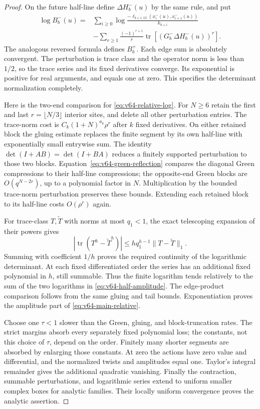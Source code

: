 \begin{proof}
On the future half-line define $\Delta H_b^-(u)$ by the same rule,
and put
\begin{equation}\label{eq:v64-half-amplitude}
 \begin{split}
 \log B_b^-(u)
  ={}&\sum_{i\ge0}\log
       \frac{-\ell_{b+i,12}(x_i^-(u),x_{i+1}^-(u))}{k_{b+i}}\\
    &-\sum_{r\ge1}\frac{(-1)^{r+1}}r
                   \operatorname{tr}[(G_b^-\Delta H_b^-(u))^r].
 \end{split}
\end{equation}
The analogous reversed formula defines $B_b^+$.  Each edge sum is
absolutely convergent.  The perturbation is trace class and the operator
norm is less than $1/2$, so the trace series and its fixed derivatives
converge.  Its exponential is positive for real arguments, and equals
one at zero.  This specifies the determinant normalization completely.

Here is the two-end comparison for \eqref{eq:v64-relative-log}.
For $N\ge6$ retain the first and last $r=\lfloor N/3\rfloor$
interior sites, and delete all other perturbation entries.  The
trace-norm cost is $C_k(1+N)^{a_k}\rho^r$ after $k$ fixed
derivatives.  On either retained block the gluing estimate replaces
the finite segment by its own half-line with exponentially small
entrywise sum.  The identity $\det(I+AB)=\det(I+BA)$ reduces a
finitely supported perturbation to those two blocks.
Equation~\eqref{eq:v64-green-reflection} compares the diagonal Green
compressions to their half-line compressions; the opposite-end Green
blocks are $O(q^{N-2r})$, up to a polynomial factor in $N$.
Multiplication by the bounded trace-norm perturbation preserves these
bounds.  Extending each retained block to its half-line costs
$O(\rho^r)$ again.

For trace-class $T,\widetilde T$ with norms at most $q_1<1$, the
exact telescoping expansion of their powers gives
\[
 |\operatorname{tr}(T^h-\widetilde T^h)|
       \le hq_1^{h-1}\|T-\widetilde T\|_1.
\]
Summing with coefficient $1/h$ proves the required continuity of the
logarithmic determinant.  At each fixed differentiated order the series
has an additional fixed polynomial in $h$, still summable.  Thus the
finite logarithm tends relatively to the sum of the two logarithms in
\eqref{eq:v64-half-amplitude}.  The edge-product comparison follows
from the same gluing and tail bounds.  Exponentiation proves the
amplitude part of \eqref{eq:v64-main-relative}.

Choose one $\tau<1$ slower than the Green, gluing, and block-truncation
rates.  The strict margins absorb every separately fixed polynomial
loss; the constants, not this choice of $\tau$, depend on the order.
Finitely many shorter segments are absorbed by enlarging those constants.
At zero the actions have zero value and differential, and the normalized
twists and amplitudes equal one.  Taylor's integral remainder gives the
additional quadratic vanishing.  Finally the contraction, summable
perturbations, and logarithmic series extend to uniform smaller complex
boxes for analytic families.  Their locally uniform convergence proves
the analytic assertion.
\end{proof}

